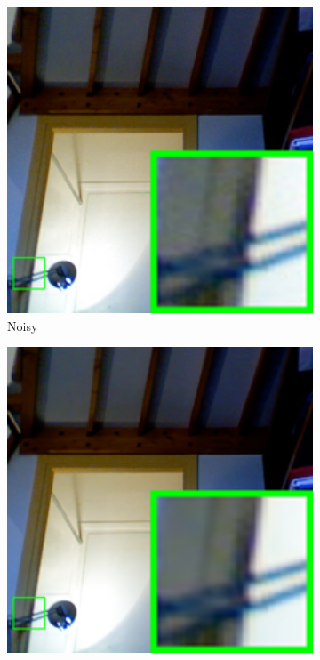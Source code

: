 \begin{figure}
    \centering
    \begin{subfigure}[t]{0.19\textwidth}
        \centering
        \includegraphics[width=1\textwidth]{images/mcwnnm/nc/resize_br_Noisy_room.png}
		\caption{Noisy}
    \end{subfigure}
    \hfill
    \begin{subfigure}[t]{0.19\textwidth}
        \centering
        \includegraphics[width=1\textwidth]{images/mcwnnm/nc/resize_br_CBM3D_room.png}

\end{subfigure}
\end{figure}
